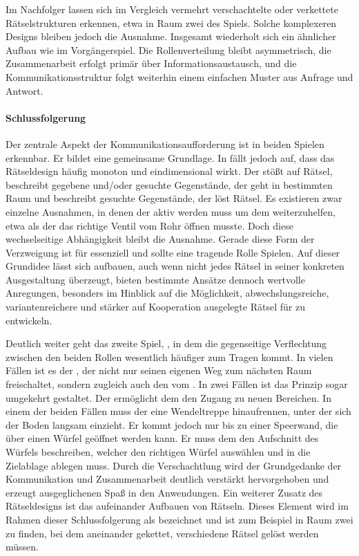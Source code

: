 Im Nachfolger  lassen sich im Vergleich vermehrt verschachtelte oder verkettete Rätselstrukturen erkennen, etwa in Raum zwei des Spiels. Solche komplexeren Designs bleiben jedoch die Ausnahme. Insgesamt wiederholt sich ein ähnlicher Aufbau wie im Vorgängerspiel. Die Rollenverteilung bleibt asymmetrisch, die Zusammenarbeit erfolgt primär über Informationsaustausch, und die Kommunikationsstruktur folgt weiterhin einem einfachen Muster aus Anfrage und Antwort.

\paragraph{Schlussfolgerung}
Der zentrale Aspekt der Kommunikationsaufforderung ist in beiden Spielen erkennbar. Er bildet eine gemeinsame Grundlage. In  fällt jedoch auf, dass das Rätseldesign häufig monoton und eindimensional wirkt. Der  stößt auf Rätsel, beschreibt gegebene und/oder gesuchte Gegenstände, der  geht in bestimmten Raum und beschreibt gesuchte Gegenstände, der  löst Rätsel. Es existieren zwar einzelne Ausnahmen, in denen der  aktiv werden muss um dem  weiterzuhelfen, etwa als der das richtige Ventil vom Rohr öffnen musste. Doch diese wechselseitige Abhängigkeit bleibt die Ausnahme. Gerade diese Form der Verzweigung ist für  essenziell und sollte eine tragende Rolle Spielen. Auf dieser Grundidee lässt sich aufbauen, auch wenn nicht jedes Rätsel in seiner konkreten Ausgestaltung überzeugt, bieten bestimmte Ansätze dennoch wertvolle Anregungen, besonders im Hinblick auf die Möglichkeit, abwechslungsreiche, variantenreichere und stärker auf Kooperation ausgelegte Rätsel für  zu entwickeln.

Deutlich weiter geht das zweite Spiel, , in dem die gegenseitige Verflechtung zwischen den beiden Rollen wesentlich häufiger zum Tragen kommt. In vielen Fällen ist es der , der nicht nur seinen eigenen Weg zum nächsten Raum freischaltet, sondern zugleich auch den vom . In zwei Fällen ist das Prinzip sogar umgekehrt gestaltet. Der  ermöglicht dem  den Zugang zu neuen Bereichen. In einem der beiden Fällen muss der  eine Wendeltreppe hinaufrennen, unter der sich der Boden langsam einzieht. Er kommt jedoch nur bis zu einer Speerwand, die über einen Würfel geöffnet werden kann. Er muss dem  den Aufschnitt des Würfels beschreiben, welcher den richtigen Würfel auswählen und in die Zielablage ablegen muss. Durch die Verschachtlung wird der Grundgedanke der Kommunikation und Zusammenarbeit deutlich verstärkt hervorgehoben und erzeugt ausgeglichenen Spaß in den Anwendungen. Ein weiterer Zusatz des Rätseldesigns ist das aufeinander Aufbauen von Rätseln. Dieses Element wird im Rahmen dieser Schlussfolgerung als  bezeichnet und ist zum Beispiel in Raum zwei zu finden, bei dem aneinander gekettet, verschiedene Rätsel gelöst werden müssen.

